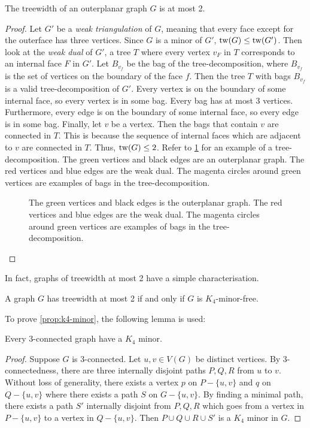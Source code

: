 \begin{proposition}\label{ex:tw_outerplanar}
	The treewidth of an outerplanar graph $G$ is at most 2.
\end{proposition}
\begin{proof}
	Let \(G'\) be a \textit{weak triangulation} of \(G\), meaning that every face except for the outerface has three vertices. Since \(G\) is a minor of \(G'\), \(\operatorname{tw}(G) \leq \operatorname{tw}(G')\). Then look at the \textit{weak dual} of \(G'\), a tree \(T\) where every vertex \(v_F\) in \(T\) corresponds to an internal face \(F\) in \(G'\). Let \(B_{v_f}\) be the bag of the tree-decomposition, where \(B_{v_f}\) is the set of vertices on the boundary of the face \(f\). Then the tree \(T\) with bags \(B_{v_f}\) is a valid tree-decomposition of \(G'\). Every vertex is on the boundary of some internal face, so every vertex is in some bag. Every bag has at most 3 vertices. Furthermore, every edge is on the boundary of some internal face, so every edge is in some bag. Finally, let $v$ be a vertex. Then the bags that contain $v$ are connected in $T$. This is because the sequence of internal faces which are adjacent to $v$ are connected in $T$. Thus, \(\operatorname{tw}(G) \leq 2\). Refer to \cref{fig:outerplanar_treedecomp} for an example of a tree-decomposition. The green vertices and black edges are an outerplanar graph. The red vertices and blue edges are the weak dual. The magenta circles around green vertices are examples of bags in the tree-decomposition.
	\begin{figure}[h!]
		\centering
		
		\caption[Tree-decomposition of outerplanar graph.]{ The green vertices and black edges is the outerplanar graph. The red vertices and blue edges are the weak dual. The magenta circles around green vertices are examples of bags in the tree-decomposition.}\label{fig:outerplanar_treedecomp}
	\end{figure}
\end{proof}

In fact, graphs of treewidth at most 2 have a simple characterisation.

\begin{proposition}\label{prop:k4-minor}
	A graph $G$ has treewidth at most 2 if and only if $G$ is $K_4$-minor-free. 
\end{proposition}

To prove \cref{prop:k4-minor}, the following lemma is used:
\begin{lemma}
	Every $3$-connected graph have a $K_4$ minor. 
\end{lemma}
\begin{proof}
	Suppose $G$ is $3$-connected. Let $u, v \in V(G)$ be distinct vertices. By $3$-connectedness, there are three internally disjoint paths $P, Q, R$ from $u$ to $v$. Without loss of generality, there exists a vertex $p$ on $P -\{u, v\}$ and $q$ on $Q -\{u, v\}$ where there exists a path $S$ on $G - \{u, v\}$. By finding a minimal path, there exists a path $S'$ internally disjoint from $P, Q, R$ which goes from a vertex in $P - \{u, v\}$ to a vertex in $Q - \{u, v\}$. Then $P \cup Q \cup R \cup S'$ is a $K_4$ minor in $G$. 
\end{proof}

